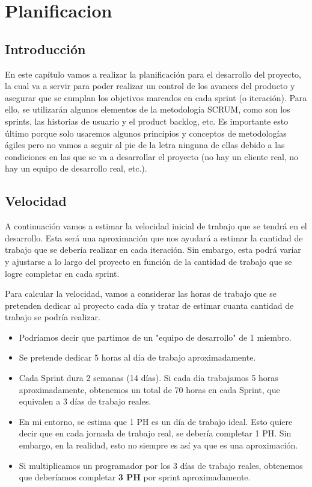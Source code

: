 \chapter{Planificacion}
\section{Introducción}
En este capítulo vamos a realizar la planificación para el desarrollo del proyecto, la cual va a servir para poder
realizar un control de los avances del producto y asegurar que se cumplan los objetivos marcados en cada sprint (o iteración).
Para ello, se utilizarán algunos elementos de la metodología SCRUM, como son los sprints, las historias de usuario y el product backlog, etc. Es importante esto último
porque solo usaremos algunos principios y conceptos de metodologías ágiles pero no vamos a seguir al pie de la letra ninguna de ellas debido
a las condiciones en las que se va a desarrollar el proyecto (no hay un cliente real, no hay un equipo de desarrollo real, etc.).

\section{Velocidad}
A continuación vamos a estimar la velocidad inicial de trabajo que se tendrá en el desarrollo. Esta será una aproximación que nos ayudará a estimar la cantidad de trabajo que se debería realizar
en cada iteración. Sin embargo, esta podrá variar y ajustarse a lo largo del proyecto en función de la cantidad de trabajo que se logre completar en cada sprint.

Para calcular la velocidad, vamos a considerar las horas de trabajo que se pretenden dedicar al proyecto cada día y tratar de estimar cuanta cantidad de trabajo se podría realizar.

\begin{itemize}
\item Podríamos decir que partimos de un "equipo de desarrollo" de 1 miembro.
\item Se pretende dedicar 5 horas al día de trabajo aproximadamente.
\item Cada Sprint dura 2 semanas (14 días). Si cada día trabajamos 5 horas aproximadamente, obtenemos un total de 70 horas en cada Sprint, que equivalen a 3 días de trabajo reales.
\item En mi entorno, se estima que 1 PH es un día de trabajo ideal. Esto quiere decir que en cada jornada de trabajo real, se debería completar 1 PH. Sin embargo, en la realidad, esto no siempre es así ya que es una aproximación.
\item Si multiplicamos un programador por los 3 días de trabajo reales, obtenemos que deberíamos completar \textbf{3 PH} por sprint aproximadamente.
\end{itemize}

